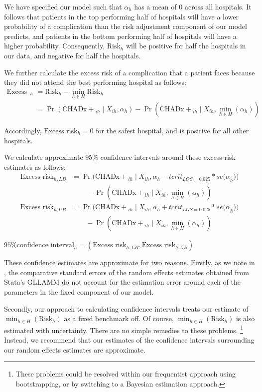 \documentclass[submission]{grattan}
\begin{document}
We have specified our model such that \(\alpha_{h}\) has a mean of 0 across all hospitals.
It follows that patients in the top performing half of hospitals will have a lower probability of a complication than the risk adjustment component of our model predicts, and patients in the bottom performing half of hospitals will have a higher probability.
Consequently, \(\text{Risk}_{h}\) will be positive for half the hospitals in our data, and negative for half the hospitals.

We further calculate the excess risk of a complication that a patient faces because they did not attend the best performing hospital as follows:
\begin{align*}
\text{Excess risk}_{h} &= \text{Risk}_{h} - \min_{h\in H}\text{Risk}_{h} \\
&= \Pr(\mathrm{CHADx+}_{ih} \mid X_{{ih}}, \alpha_{h}) - \Pr(\mathrm{CHADx+}_{{ih}}\mid X_{{ih}},\min_{h\in H}(\alpha_{h}))
\end{align*}

Accordingly, \(\text{Excess risk}_{h} = 0\) for the safest hospital, and is positive for all other hospitals.

We calculate approximate 95\% confidence intervals around these excess risk estimates as follows:
\begin{align*}
\text{Excess risk}_{h,LB} &= {\Pr(\mathrm{CHADx+}_{ih}\mid X_{{ih}},\alpha_{h} - tcrit_{LOS = 0.025}* se(\alpha}_{h}))\\
&\qquad {}- \Pr(\mathrm{CHADx+}_{ih} \mid X_{ih},\min_{h\in H}(\alpha_{h})) \\
\text{Excess risk}_{h,UB} &= {\Pr(\mathrm{CHADx+}_{ih}\mid X_{{ih}},\alpha_{h} + tcrit_{LOS = 0.025}* se(\alpha}_{h}))\\
&\qquad {}- \Pr(\mathrm{CHADx+}_{ih} \mid X_{ih},\min_{h\in H}(\alpha_{h}))
\end{align*}

\(\text{95\% confidence interval}_{h} = (\text{Excess risk}_{h,LB}, \text{Excess risk}_{h,UB})\)

These confidence estimates are approximate for two reasons.
Firstly, as we note in , the comparative standard errors of the random effects estimates obtained from Stata's GLLAMM do not account for the estimation error around each of the parameters in the fixed component of our model.

Secondly, our approach to calculating confidence intervals treats our estimate of \(\min_{h\in H}(\text{Risk}_{h})\) as a fixed benchmark off.
Of course, \(\min_{h\in H}(\text{Risk}_{h})\) is also estimated with uncertainty.
There are no simple remedies to these problems.%
\footnote{These problems could be resolved within our frequentist approach using bootstrapping, or by switching to a Bayesian estimation approach.}
Instead, we recommend that our estimates of the confidence intervals surrounding our random effects estimates are approximate.
\end{document}
